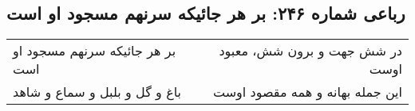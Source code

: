 \begin{center}
\section*{رباعی شماره ۲۴۶: بر هر جائیکه سرنهم مسجود او است}
\label{sec:0246}
\begin{longtable}{l p{0.5cm} r}
بر هر جائیکه سرنهم مسجود او است
&&
در شش جهت و برون شش، معبود اوست
\\
باغ و گل و بلبل و سماع و شاهد
&&
این جمله بهانه و همه مقصود اوست
\\
\end{longtable}
\end{center}
